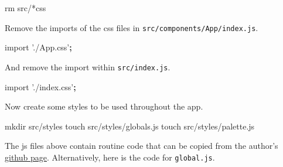 \documentclass[]{book}
\newenvironment{Shaded}{\begin{snugshade}}{\end{snugshade}}
\newcommand{\KeywordTok}[1]{\textcolor[rgb]{0.13,0.29,0.53}{\textbf{#1}}}
\newcommand{\StringTok}[1]{\textcolor[rgb]{0.31,0.60,0.02}{#1}}
\newcommand{\FunctionTok}[1]{\textcolor[rgb]{0.00,0.00,0.00}{#1}}
\newcommand{\ExtensionTok}[1]{#1}
\newcommand{\NormalTok}[1]{#1}
\begin{document}
\begin{Shaded}
\begin{Highlighting}[]
\FunctionTok{rm}\NormalTok{ src/*css}
\end{Highlighting}
\end{Shaded}

Remove the imports of the css files in
\texttt{src/components/App/index.js}.

\begin{Shaded}
\begin{Highlighting}[]
\ExtensionTok{import} \StringTok{'./App.css'}\KeywordTok{;}
\end{Highlighting}
\end{Shaded}

And remove the import within \texttt{src/index.js}.

\begin{Shaded}
\begin{Highlighting}[]
\ExtensionTok{import} \StringTok{'./index.css'}\KeywordTok{;}
\end{Highlighting}
\end{Shaded}

Now create some styles to be used throughout the app.

\begin{Shaded}
\begin{Highlighting}[]
\FunctionTok{mkdir}\NormalTok{ src/styles}
\FunctionTok{touch}\NormalTok{ src/styles/globals.js}
\FunctionTok{touch}\NormalTok{ src/styles/palette.js}
\end{Highlighting}
\end{Shaded}

The js files above contain routine code that can be copied from the
author's \href{https://github.com/treyhuffine/hn-clone}{github page}.
Alternatively, here is the code for \texttt{global.js}.
\end{document}
